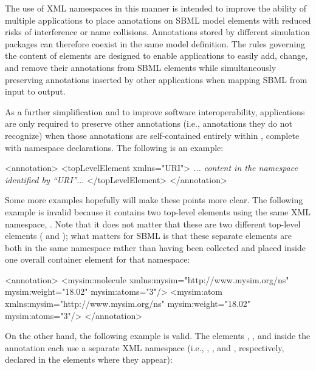 The use of XML namespaces in this manner is intended to improve
the ability of multiple applications to place annotations on SBML
model elements with reduced risks of interference or name
collisions.  Annotations stored by different simulation packages
can therefore coexist in the same model definition.  The rules
governing the content of  elements are designed
to enable applications to easily add, change, and remove their
annotations from SBML elements while simultaneously preserving
annotations inserted by other applications when mapping SBML from
input to output.

As a further simplification and to improve software
interoperability, applications are only required to preserve other
annotations (i.e., annotations they do not recognize) when those
annotations are self-contained entirely within ,
complete with namespace declarations.  The following is an
example:

\begin{example}
<annotation>
    <topLevelElement xmlns="URI">
       \textrm{\emph{... content in the namespace identified by \textquotedblleft{}URI\textquotedblright}...}
    </topLevelElement>
</annotation>
\end{example}

Some more examples hopefully will make these points more clear.
The following example is invalid because it contains two top-level
elements using the same XML namespace,  .  Note that it does not
matter that these are two different top-level elements
( and ); what matters for
SBML is that these separate elements are both in the same
namespace rather than having been collected and placed inside one
overall container element for that namespace:

\begin{example}
<annotation>
   <mysim:molecule xmlns:mysim="http://www.mysim.org/ns" mysim:weight="18.02" mysim:atoms="3"/>
   <mysim:atom xmlns:mysim="http://www.mysim.org/ns" mysim:weight="18.02" mysim:atoms="3"/>
</annotation>
\end{example}

On the other hand, the following example is valid. The elements , , and  inside the annotation each use a separate XML namespace (i.e., , , and , respectively, declared in the elements where they appear):

